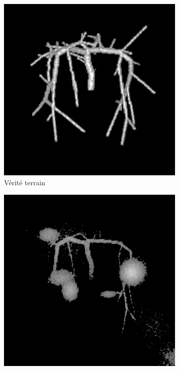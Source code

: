 
\begin{figure}[!ht]
  \captionsetup[subfigure]{justification=centering}
  \begin{subfigure}[t]{0.32\textwidth}
    \includegraphics[clip = true, trim = 80 80 80 80,width=\textwidth]{Images/Vascu_4_GT.png}
    \caption{Vérité terrain}  
  \end{subfigure}
  \begin{subfigure}[t]{0.32\textwidth}
    \includegraphics[clip = true, trim = 80 80 80 80,width=\textwidth]{Images/Vascu_4_Baseline.png}

\end{subfigure}
\end{figure}
